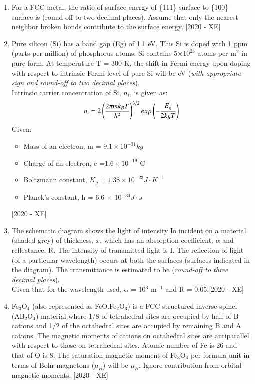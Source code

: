 \documentclass[journal]{IEEEtran}
\begin{document}
\begin{enumerate}
    \item For a FCC metal, the ratio of surface energy of \{111\} surface to \{100\} surface is \underline{\hspace{3cm}} (round-off to two decimal places). Assume that only the nearest neighbor broken bonds contribute to the surface energy. \hfill{[2020 - XE]}
    \item  Pure silicon (Si) has a band gap (Eg) of 1.1 eV. This Si is doped with 1 ppm (parts per million) of phosphorus atoms. Si contains 5$\times 10^{28}$ atoms per m$^2$ in pure form. At temperature T = 300 K, the shift in Fermi energy upon doping with respect to intrinsic Fermi level of pure Si will be \underline{\hspace{3cm}} eV (\textit{with appropriate sign and round-off to two decimal places}).\\
    Intrinsic carrier concentration of Si, $n_i$, is given as:
    $$n_i = 2\left(\frac{2\pi mk_B T}{h^2}\right)^{3/2} exp\left(-\frac{E_g}{2k_B T}\right)$$
    Given:
    \begin{itemize}
        \item Mass of an electron, m = $9.1 \times 10^{-31} kg$
        \item Charge of an electron, e =$1.6 \times 10^{-19}$ C
        \item Boltzmann constant, $K_g = 1.38 \times 10^{-23} J\cdot K^{-1}$
        \item Planck's constant, h = 6.6 $\times$ 10$^{-34} J\cdot s$
    \end{itemize}\hfill{[2020 - XE]}
    \item The schematic diagram shows the light of intensity Io incident on a material (shaded grey) of thickness, $x$, which has an absorption coefficient, $\alpha$ and reflectance, R. The intensity of transmitted light is I. The reflection of light (of a particular wavelength) occurs at both the surfaces (surfaces indicated in the diagram). The transmittance is estimated to be \underline{\hspace{3cm}} (\textit{round-off to three decimal places}).\\
    Given that for the wavelength used, $\alpha$ = 10$^3$ m$^{-1}$ and R = 0.05.\hfill{[2020 - XE]}
    
    \item Fe$_3$O$_4$ (also represented as FeO.Fe$_2$O$_3$) is a FCC structured inverse spinel (AB$_2$O$_4$) material where 1/8 of tetrahedral sites are occupied by half of B cations and 1/2 of the octahedral sites are occupied by remaining B and A cations. The magnetic moments of cations on octahedral sites are antiparallel with respect to those on tetrahedral sites. Atomic number of Fe is 26 and that of O is 8. The saturation magnetic moment of Fe$_3$O$_4$ per formula unit in terms of Bohr magnetons ($\mu_B$) will be \underline{\hspace{3cm}} $\mu_B$. Ignore contribution from orbital magnetic moments. \hfill{[2020 - XE]}

\end{enumerate}
\end{document}
